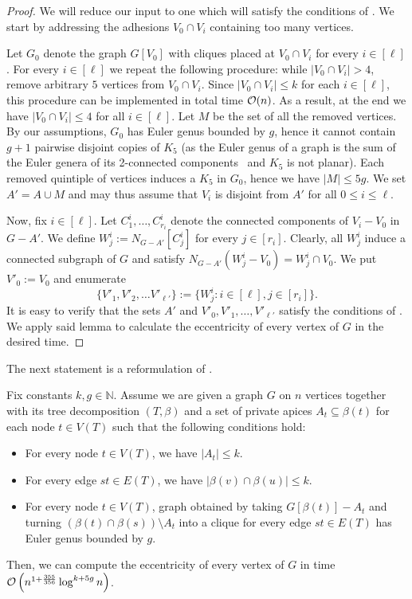 \begin{proof}
We will reduce our input to one which will satisfy the conditions of . We start by addressing the adhesions $V_0 \cap V_i$ containing too many vertices.

Let $G_0$ denote the graph $G[V_0]$ with cliques placed at $V_0 \cap V_i$ for every $i \in [\ell]$.
For every $i \in [\ell]$ we repeat the following procedure: while $|V_0 \cap V_i| > 4$,
remove arbitrary $5$ vertices from $V_0 \cap V_i$. Since $|V_0 \cap V_i| \leq k$ for each $i\in [\ell]$,
this procedure can be implemented in total time $\mathcal{O}(n)$. As a result, at the end we have $|V_0 \cap V_i| \leq 4$ for all $i \in [\ell]$. Let $M$ be the set of all the removed vertices. By our assumptions, $G_0$ has Euler genus bounded by $g$, hence it cannot contain $g + 1$ pairwise disjoint copies of $K_5$
(as the Euler genus of a graph is the sum of the Euler genera of its 2-connected components~\cite{StahlB77} and $K_5$ is not planar). Each removed quintiple of vertices induces a $K_5$ in $G_0$, hence we have $|M| \leq 5g$. We set $A' = A \cup M$ and may thus assume that $V_i$ is disjoint from $A'$ for all $0 \leq i \leq \ell$.

Now, fix $i \in [\ell]$. Let $C^i_1, \dots, C^i_{r_i}$ denote the connected components of $V_i - V_0$ in $G - A'$. We define $W^i_j := N_{G - A'}[C^i_j]$ for every $j \in [r_i]$. Clearly, all $W^i_j$ induce a connected subgraph of $G$ and satisfy $N_{G - A'}(W^i_j - V_0) = W^i_j \cap V_0$. We put $V'_0 := V_0$ and enumerate
$$
\{V'_1, V'_2, \dots V'_{\ell'}\} := \{ W^i_j \colon i \in [\ell], j \in [r_i] \}.
$$
It is easy to verify that the sets $A'$ and $V'_0, V'_1, \dots, V'_{\ell'}$ satisfy the conditions of . We apply said lemma to calculate the eccentricity of every vertex of $G$ in the desired time.
\end{proof}



The next statement is a reformulation of .

\begin{theorem}
Fix constants $k, g \in \mathbb{N}$. Assume we are given a graph $G$ on $n$ vertices together with its tree decomposition $(T, \beta)$ and a set of private apices $A_t \subseteq \beta(t)$ for each node $t\in V(T)$ such that the following conditions hold:
\begin{itemize}[nosep]
 \item For every node $t \in V(T)$, we have $|A_t| \leq k$.
 \item For every edge $st \in E(T)$,  we have $|\beta(v) \cap \beta(u)|\leq k$.
 \item For every node $t \in V(T)$, graph obtained by taking $G[\beta(t)] - A_t$ and turning  $(\beta(t) \cap \beta(s))\setminus A_t$ into a clique for every edge $st \in E(T)$ has Euler genus bounded by $g$.
\end{itemize}
Then, we can compute the eccentricity of every vertex of $G$ in time $\mathcal{O} \left( n^{1 + \frac{355}{356}} \log^{k + 5g} n \right)$.
\end{theorem}

